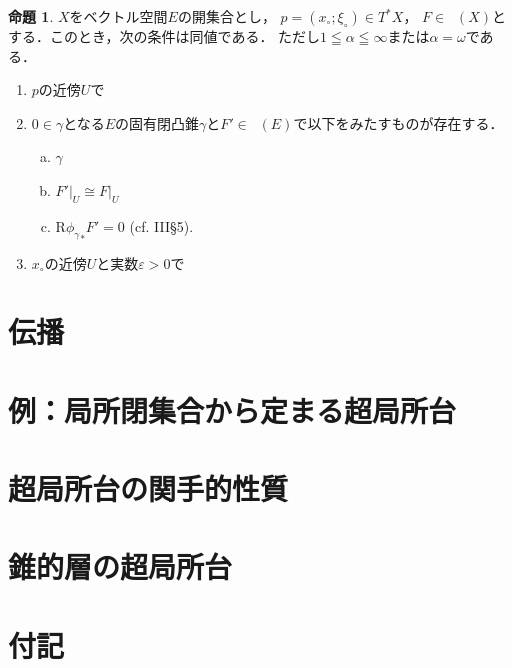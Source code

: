 \documentclass[uplatex,dvipdfmx,b5paper,9pt,draft]{jsreport}
\theoremstyle{definition}
\numberwithin{equation}{section}
\newcommand{\Dompb}{\mathop{\mathsf{D}^\mathrm{b}}\nolimits}
\newcommand{\Rder}{\mathrm{R}}
\newcommand{\mres}[2][]{{\left.{#1}\right\rvert}_{#2}}
\theoremstyle{mystyle}
\newtheorem{myprp}[mythm]{命題}
\newenvironment{prp}{\begin{prpbox}\begin{myprp}}{\end{myprp}\end{prpbox}}
\begin{document}
\begin{prp}
    \(X\)をベクトル空間\(E\)の開集合とし，
    \(p=(x_{\circ};\xi_{\circ})\in T^{\ast}X\)，
    \(F\in \Dompb(X)\)とする．このとき，次の条件は同値である．
    ただし\(1\leqq\alpha\leqq\infty\)または\(\alpha=\omega\)である．
    \begin{enumerate}[(1)]
        \item[\((1)_{\alpha}\)] \(p\)の近傍\(U\)で
        \setcounter{enumi}{1}
        \item \(0\in\gamma\)となる\(E\)の固有閉凸錐\(\gamma\)と\(F'\in\Dompb(E)\)で以下をみたすものが存在する．\begin{enumerate}[(a)]
            \item \(\gamma\)
            \item \(\mres[F']{U}\cong \mres[F]{U}\)
            \item \(\Rder{{\phi_{\gamma}}_{\ast}}F'=0\) (cf. III\S5).
        \end{enumerate}
        \item \(x_{\circ}\)の近傍\(U\)と実数\(\varepsilon>0\)で
    \end{enumerate}
\end{prp}

















\section{伝播}
\section{例：局所閉集合から定まる超局所台}
\section{超局所台の関手的性質}
\section{錐的層の超局所台}

\section*{付記}
\end{document}

